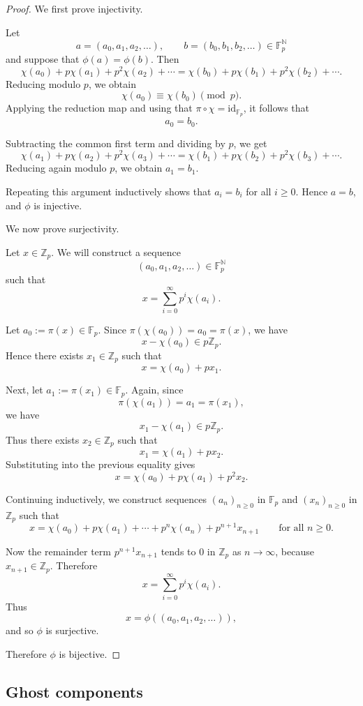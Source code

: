 \documentclass[oneside, a4paper, onecolumn, 11pt]{article}
\theoremstyle{definition}
\begin{document}
\begin{proof}
We first prove injectivity.

Let
\[a=(a_0,a_1,a_2,\ldots), \qquad b=(b_0,b_1,b_2,\ldots)\in\mathbb F_p^{\mathbb N}\]
and suppose that $\phi(a)=\phi(b)$. Then
\[\chi(a_0)+p\chi(a_1)+p^2\chi(a_2)+\cdots=\chi(b_0)+p\chi(b_1)+p^2\chi(b_2)+\cdots.\]
Reducing modulo $p$, we obtain
\[\chi(a_0)\equiv \chi(b_0)\pmod p.\]
Applying the reduction map and using that $\pi\circ\chi=\mathrm{id}_{\mathbb F_p}$, it follows that
\[a_0=b_0.\]

Subtracting the common first term and dividing by $p$, we get
\[\chi(a_1)+p\chi(a_2)+p^2\chi(a_3)+\cdots=\chi(b_1)+p\chi(b_2)+p^2\chi(b_3)+\cdots.\]
Reducing again modulo $p$, we obtain $a_1=b_1$.

Repeating this argument inductively shows that $a_i=b_i$ for all $i\ge 0$. Hence $a=b$, and $\phi$ is injective.

We now prove surjectivity.

Let $x\in\mathbb Z_p$. We will construct a sequence
\[(a_0,a_1,a_2,\ldots)\in\mathbb F_p^{\mathbb N}\]
such that
\[x=\sum_{i=0}^\infty p^i\chi(a_i).\]

Let $a_0:=\pi(x)\in\mathbb F_p$. Since $\pi(\chi(a_0))=a_0=\pi(x)$, we have
\[x-\chi(a_0)\in p\mathbb Z_p.\]
Hence there exists $x_1\in\mathbb Z_p$ such that
\[x=\chi(a_0)+px_1.\]

Next, let $a_1:=\pi(x_1)\in\mathbb F_p$. Again, since
\[\pi(\chi(a_1))=a_1=\pi(x_1),\]
we have
\[x_1-\chi(a_1)\in p\mathbb Z_p.\]
Thus there exists $x_2\in\mathbb Z_p$ such that
\[x_1=\chi(a_1)+px_2.\]
Substituting into the previous equality gives
\[x=\chi(a_0)+p\chi(a_1)+p^2x_2.\]

Continuing inductively, we construct sequences $(a_n)_{n\ge0}$ in $\mathbb F_p$
and $(x_n)_{n\ge0}$ in $\mathbb Z_p$ such that
\[x=\chi(a_0)+p\chi(a_1)+\cdots+p^n\chi(a_n)+p^{n+1}x_{n+1}\qquad\text{for all } n\ge0.\]

Now the remainder term $p^{n+1}x_{n+1}$ tends to $0$ in $\mathbb Z_p$ as
$n\to\infty$, because $x_{n+1}\in\mathbb Z_p$. Therefore
\[x=\sum_{i=0}^\infty p^i\chi(a_i).\]
Thus
\[x=\phi((a_0,a_1,a_2,\ldots)),\]
and so $\phi$ is surjective.

Therefore $\phi$ is bijective.
\end{proof}

\subsection{Ghost components}
\end{document}
